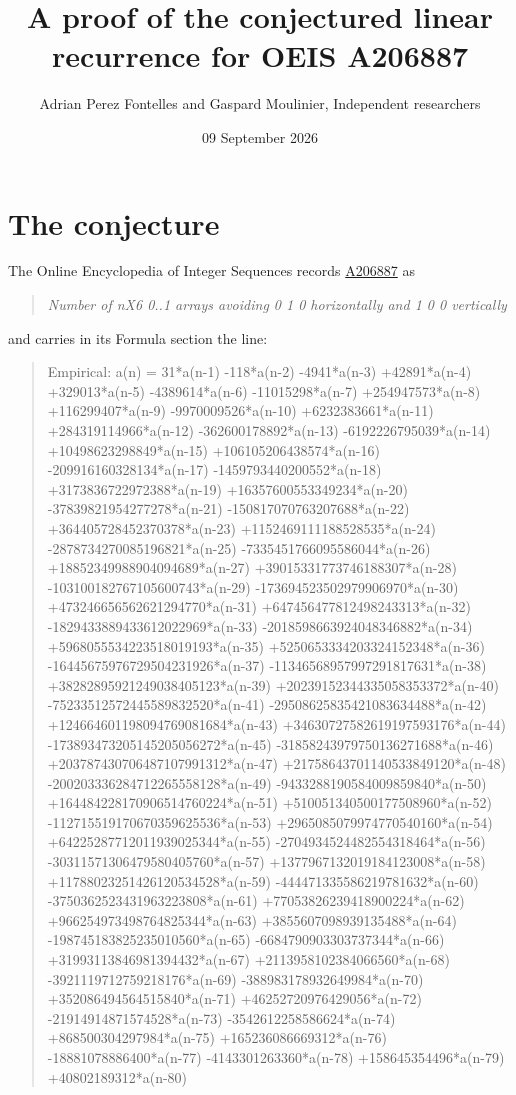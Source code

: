 \documentclass[11pt]{article}
\title{A proof of the conjectured linear recurrence for OEIS A206887}
\author{Adrian Perez Fontelles and Gaspard Moulinier, Independent researchers}
\date{09 September 2026}
\theoremstyle{definition}
\begin{document}
\maketitle
\section{The conjecture}

The Online Encyclopedia of Integer Sequences records \href{https://oeis.org/A206887}{A206887} as

\begin{quote}\itshape Number of nX6 0..1 arrays avoiding 0 1 0 horizontally and 1 0 0 vertically\end{quote}

and carries in its Formula section the line:

\begin{quote}\ttfamily Empirical: a(n) = 31*a(n-1) -118*a(n-2) -4941*a(n-3) +42891*a(n-4) +329013*a(n-5) -4389614*a(n-6) -11015298*a(n-7) +254947573*a(n-8) +116299407*a(n-9) -9970009526*a(n-10) +6232383661*a(n-11) +284319114966*a(n-12) -362600178892*a(n-13) -6192226795039*a(n-14) +10498623298849*a(n-15) +106105206438574*a(n-16) -209916160328134*a(n-17) -1459793440200552*a(n-18) +3173836722972388*a(n-19) +16357600553349234*a(n-20) -37839821954277278*a(n-21) -150817070763207688*a(n-22) +364405728452370378*a(n-23) +1152469111188528535*a(n-24) -2878734270085196821*a(n-25) -7335451766095586044*a(n-26) +18852349988904094689*a(n-27) +39015331773746188307*a(n-28) -103100182767105600743*a(n-29) -173694523502979906970*a(n-30) +473246656562621294770*a(n-31) +647456477812498243313*a(n-32) -1829433889433612022969*a(n-33) -2018598663924048346882*a(n-34) +5968055534223518019193*a(n-35) +5250653334203324152348*a(n-36) -16445675976729504231926*a(n-37) -11346568957997291817631*a(n-38) +38282895921249038405123*a(n-39) +20239152344335058353372*a(n-40) -75233512572445589832520*a(n-41) -29508625835421083634488*a(n-42) +124664601198094769081684*a(n-43) +34630727582619197593176*a(n-44) -173893473205145205056272*a(n-45) -31858243979750136271688*a(n-46) +203787430706487107991312*a(n-47) +21758643701140533849120*a(n-48) -200203336284712265558128*a(n-49) -9433288190584009859840*a(n-50) +164484228170906514760224*a(n-51) +510051340500177508960*a(n-52) -112715519170670359625536*a(n-53) +2965085079974770540160*a(n-54) +64225287712011939025344*a(n-55) -2704934524482554318464*a(n-56) -30311571306479580405760*a(n-57) +1377967132019184123008*a(n-58) +11788023251426120534528*a(n-59) -444471335586219781632*a(n-60) -3750362523431963223808*a(n-61) +77053826239418900224*a(n-62) +966254973498764825344*a(n-63) +3855607098939135488*a(n-64) -198745183825235010560*a(n-65) -6684790903303737344*a(n-66) +31993113846981394432*a(n-67) +2113958102384066560*a(n-68) -3921119712759218176*a(n-69) -388983178932649984*a(n-70) +352086494564515840*a(n-71) +46252720976429056*a(n-72) -21914914871574528*a(n-73) -3542612258586624*a(n-74) +868500304297984*a(n-75) +165236086669312*a(n-76) -18881078886400*a(n-77) -4143301263360*a(n-78) +158645354496*a(n-79) +40802189312*a(n-80)\end{quote}
\end{document}
